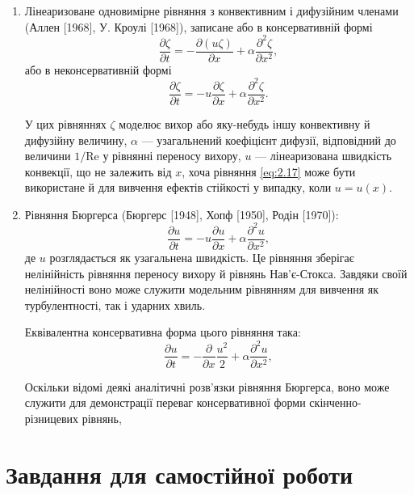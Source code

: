 \begin{enumerate}
    \item Лінеаризоване одновимірне рівняння з конвективним і дифузійним членами (Аллен [1968], У. Кроулі [1968]), записане або в консервативній формі
    \begin{equation}
        \label{eq:2.17}
        \frac{\partial \zeta}{\partial t} = - \frac{\partial (u \zeta)}{\partial x} + \alpha \frac{\partial^2 \zeta}{\partial x^2},
    \end{equation}
    або в неконсервативній формі
    \begin{equation}
        \label{eq:2.18}
        \frac{\partial \zeta}{\partial t} = - u \frac{\partial \zeta}{\partial x} + \alpha \frac{\partial^2 \zeta}{\partial x^2}.
    \end{equation}
    
    У цих рівняннях $\zeta$ моделює вихор або яку-небудь іншу конвективну й дифузійну величину, $\alpha$ --- узагальнений коефіцієнт дифузії, відповідний до величини $1/\text{Re}$ у рівнянні переносу вихору, $u$ --- лінеаризована швидкість конвекції, що не залежить від $x$, хоча рівняння \eqref{eq:2.17} може бути використане й для вивчення ефектів стійкості у випадку, коли $u = u(x)$.

    \item Рівняння Бюргерса (Бюргерс [1948], Хопф [1950], Родін [1970]):
    \begin{equation}
        \label{eq:2.19}
        \frac{\partial u}{\partial t} = - u \frac{\partial u}{\partial x} + \alpha \frac{\partial^2 u}{\partial x^2},
    \end{equation}
    де $u$ розглядається як узагальнена швидкість. Це рівняння зберігає нелінійність рівняння переносу вихору й рівнянь Нав'є-Стокса. Завдяки своїй нелінійності воно може служити модельним рівнянням для вивчення як турбулентності, так і ударних хвиль. \medskip 

    Еквівалентна консервативна форма цього рівняння така:
    \begin{equation}
        \label{eq:2.20}
        \frac{\partial u}{\partial t} = - \frac{\partial}{\partial x} \frac{u^2}{2} + \alpha \frac{\partial^2 u}{\partial x^2},
    \end{equation}
    
    Оскільки відомі деякі аналітичні розв'язки рівняння Бюргерса, воно може служити для демонстрації переваг консервативної форми скінченно-різницевих рівнянь,
\end{enumerate}

\section{Завдання для самостійної роботи}



